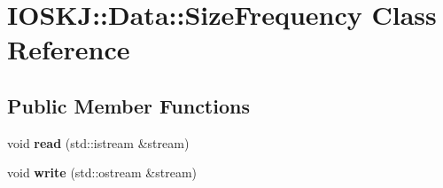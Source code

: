 \hypertarget{classIOSKJ_1_1Data_1_1SizeFrequency}{\section{I\-O\-S\-K\-J\-:\-:Data\-:\-:Size\-Frequency Class Reference}
\label{classIOSKJ_1_1Data_1_1SizeFrequency}
}
\subsection*{Public Member Functions}
\begin{DoxyCompactItemize}
\item 
\hypertarget{classIOSKJ_1_1Data_1_1SizeFrequency_a47ab1ffa698fd8b3158eec2451a07b99}{void {\bfseries read} (std\-::istream \&stream)}\label{classIOSKJ_1_1Data_1_1SizeFrequency_a47ab1ffa698fd8b3158eec2451a07b99}

\item 
\hypertarget{classIOSKJ_1_1Data_1_1SizeFrequency_ae75970f485f011f5191566ca0987c572}{void {\bfseries write} (std\-::ostream \&stream)}\label{classIOSKJ_1_1Data_1_1SizeFrequency_ae75970f485f011f5191566ca0987c572}

\end{DoxyCompactItemize}
